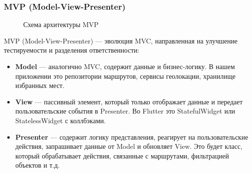 \subsubsection*{MVP (Model-View-Presenter)}

\begin{figure}[H]
\centering
{}
\caption{Схема архитектуры MVP}
\label{fig:mvp}
\end{figure}


MVP (Model-View-Presenter) — эволюция MVC, направленная на улучшение тестируемости и разделения ответственности:

\begin{itemize}
    \item \textbf{Model} — аналогично MVC, содержит данные и бизнес-логику. В нашем приложении это репозитории маршрутов, сервисы геолокации, хранилище избранных мест.
    \item \textbf{View} — пассивный элемент, который только отображает данные и передает пользовательские события в Presenter. Во Flutter это StatefulWidget или StatelessWidget с коллбэками.
    \item \textbf{Presenter} — содержит логику представления, реагирует на пользовательские действия, запрашивает данные от Model и обновляет View. Это будет класс, который обрабатывает действия, связанные с маршрутами, фильтрацией объектов и т.д.
\end{itemize}


